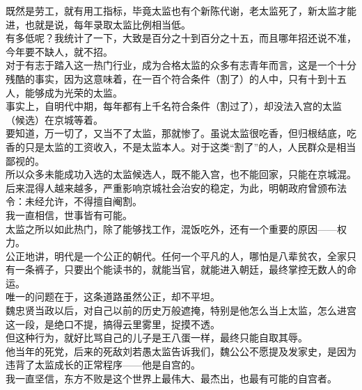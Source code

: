 \begin{multicols}{\theparacolNo}
既然是劳工，就有用工指标，毕竟太监也有个新陈代谢，老太监死了，新太监才能进，也就是说，每年录取太监比例相当低。\\

有多低呢？我统计了一下，大致是百分之十到百分之十五，而且哪年招还说不准，今年要不缺人，就不招。\\

对于有志于踏入这一热门行业，成为合格太监的众多有志青年而言，这是一个十分残酷的事实，因为这意味着，在一百个符合条件（割了）的人中，只有十到十五人，能够成为光荣的太监。\\

事实上，自明代中期，每年都有上千名符合条件（割过了），却没法入宫的太监（候选）在京城等着。\\

要知道，万一切了，又当不了太监，那就惨了。虽说太监很吃香，但归根结底，吃香的只是太监的工资收入，不是太监本人。对于这类“割了”的人，人民群众是相当鄙视的。\\

所以众多未能成功入选的太监候选人，既不能入宫，也不能回家，只能在京城混。后来混得人越来越多，严重影响京城社会治安的稳定，为此，明朝政府曾颁布法令：未经允许，不得擅自阉割。\\

我一直相信，世事皆有可能。\\

太监之所以如此热门，除了能够找工作，混饭吃外，还有一个重要的原因——权力。\\

公正地讲，明代是一个公正的朝代。任何一个平凡的人，哪怕是八辈贫农，全家只有一条裤子，只要出个能读书的，就能当官，就能进入朝廷，最终掌控无数人的命运。\\

唯一的问题在于，这条道路虽然公正，却不平坦。\\

魏忠贤当政以后，对自己以前的历史万般遮掩，特别是他怎么当上太监，怎么进宫这一段，是绝口不提，搞得云里雾里，捉摸不透。\\

但这种行为，就好比骂自己的儿子是王八蛋一样，最终只能自取其辱。\\

他当年的死党，后来的死敌刘若愚太监告诉我们，魏公公不愿提及发家史，是因为违背了太监成长的正常程序——他是自宫的。\\

我一直坚信，东方不败是这个世界上最伟大、最杰出，也最有可能的自宫者。\\


\end{multicols}
